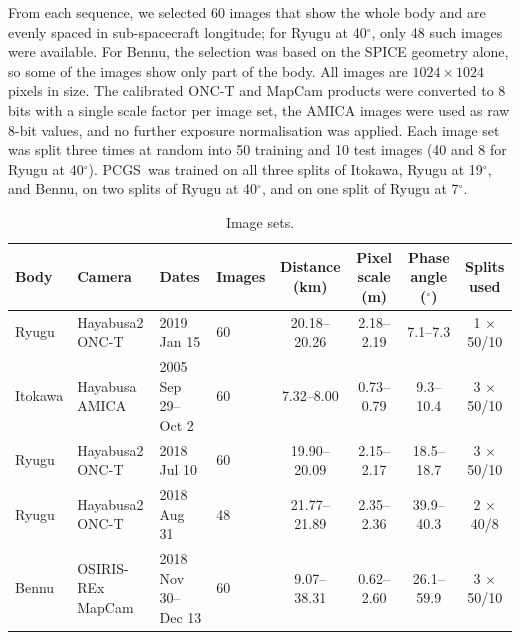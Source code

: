 \documentclass[fleqn,usenatbib]{aa}
\newcommand{\pcgs}{PCGS}
\begin{document}
From each sequence, we selected 60 images that show the whole body and are evenly spaced in sub-spacecraft longitude;
for Ryugu at 40$^\circ$, only 48 such images were available. For Bennu, the selection was based on the SPICE geometry
alone, so some of the images show only part of the body. All images are $1024\times1024$ pixels in size. The
calibrated ONC-T and MapCam products were converted to 8 bits with a single scale factor per image set, the AMICA
images were used as raw 8-bit values, and no further exposure normalisation was applied. Each image set was split
three times at random into 50 training and 10 test images (40 and 8 for Ryugu at 40$^\circ$). \pcgs\ was trained on
all three splits of Itokawa, Ryugu at 19$^\circ$, and Bennu, on two splits of Ryugu at 40$^\circ$, and on one split of
Ryugu at 7$^\circ$.

\begin{table}
\caption{Image sets.}
\label{tab:data}
\centering
\small\setlength{\tabcolsep}{4pt}
\begin{tabular}{@{}llllcccc@{}}
\toprule
Body & Camera & Dates & Images & Distance (km) & Pixel scale (m) & Phase angle ($^\circ$) & Splits used \\
\midrule
Ryugu   & Hayabusa2 ONC-T  & 2019 Jan 15        & 60 & 20.18--20.26 & 2.18--2.19 & 7.1--7.3   & 1 $\times$ 50/10 \\
Itokawa & Hayabusa AMICA   & 2005 Sep 29--Oct 2 & 60 & 7.32--8.00   & 0.73--0.79 & 9.3--10.4  & 3 $\times$ 50/10 \\
Ryugu   & Hayabusa2 ONC-T  & 2018 Jul 10        & 60 & 19.90--20.09 & 2.15--2.17 & 18.5--18.7 & 3 $\times$ 50/10 \\
Ryugu   & Hayabusa2 ONC-T  & 2018 Aug 31        & 48 & 21.77--21.89 & 2.35--2.36 & 39.9--40.3 & 2 $\times$ 40/8 \\
Bennu   & OSIRIS-REx MapCam & 2018 Nov 30--Dec 13 & 60 & 9.07--38.31 & 0.62--2.60 & 26.1--59.9 & 3 $\times$ 50/10 \\
\bottomrule
\end{tabular}
\end{table}
\end{document}
